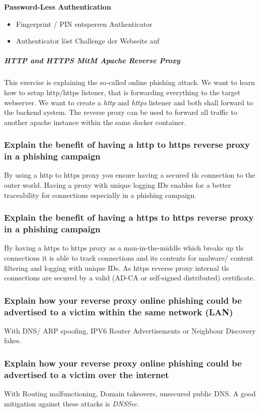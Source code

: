 \textbf{Password-Less Authentication}
\begin{itemize}
    \item Fingerprint / PIN entsperren Authenticator
    \item Authenticator löst Challenge der Webseite auf
\end{itemize}

\subparagraph{HTTP and HTTPS MitM Apache Reverse Proxy}

This exercise is explaining the so-called online phishing attack. We want to learn how to setup http/https listener, that is forwarding everything to the target webserver. We want to create a \textit{http} and \textit{https} listener and both shall forward to the backend system. The reverse proxy can be used to forward all traffic to another apache instance within the same docker container.

\subsubsection{Explain the benefit of having a http to https reverse proxy in a phishing campaign}
By using a http to https proxy you ensure having a secured tls connection to the outer world. Having a proxy with unique logging IDs enables for a better traceability for connections especially in a phishing campaign.

\subsubsection{Explain the benefit of having a https to https reverse proxy in a phishing campaign}
By having a https to https proxy as a man-in-the-middle which breaks up tls connections it is able to track connections and its contents for malware/ content filtering and logging with unique IDs. As https reverse proxy internal tls connections are secured by a valid (AD-CA or self-signed distributed) certificate.

\subsubsection{Explain how your reverse proxy online phishing could be advertised to a victim within the same network (LAN)}
With DNS/ ARP spoofing, IPV6 Router Advertisements or Neighbour Discovery fakes.

\subsubsection{Explain how your reverse proxy online phishing could be advertised to a victim over the internet}
With Routing malfunctioning, Domain takeovers, unsecured public DNS. A good mitigation against these attacks is \textit{DNSSec}.

